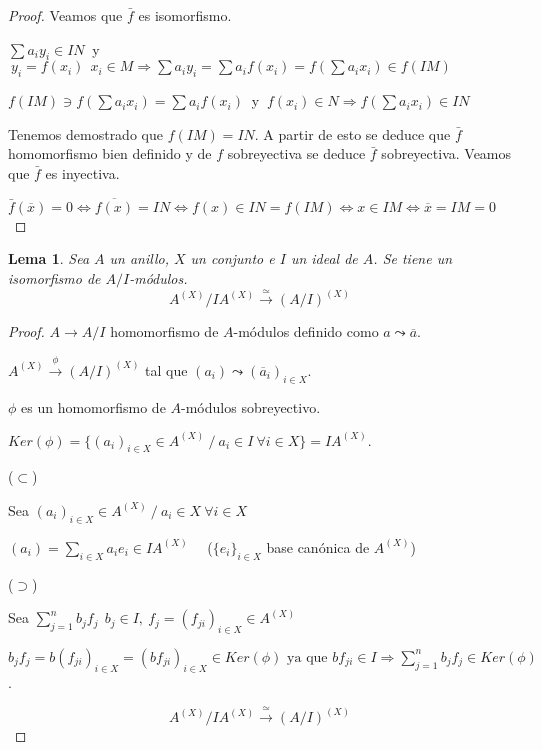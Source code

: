 \documentclass{article}
\theoremstyle{theorem-style}  %
\newtheorem{lemma}[theorem]{Lema}
\theoremstyle{definition}
\theoremstyle{example-style}
\begin{document}
	\begin{proof} 
		Veamos que $\bar{f}$ es isomorfismo.

		$\sum a_iy_i \in IN\ $ y $\  y_i=f(x_i)  \ \ x_i\in M \Rightarrow \sum a_iy_i=\sum a_if(x_i)=f(\sum a_ix_i)\in f(IM)$

		$f(IM) \ni f(\sum a_ix_i) = \sum a_if(x_i) \ $ y $\ f(x_i)\in N \Rightarrow f(\sum a_ix_i)\in IN$

		Tenemos demostrado que $f(IM)=IN$. A partir de esto se deduce que $\bar{f}$ homomorfismo bien definido y de $f$ sobreyectiva se deduce $\bar{f}$ sobreyectiva. Veamos que $\bar{f}$ es inyectiva.

		$\bar{f}(\overline{x})=0 \Leftrightarrow \overline{f(x)} = IN \Leftrightarrow f(x) \in IN=f(IM) \Leftrightarrow x \in IM \Leftrightarrow \overline{x}=IM=0$

	\end{proof}

	\begin{lemma}
		Sea $A$ un anillo, $X$ un conjunto e $I$ un ideal de $A$. Se tiene un isomorfismo de $A/I$-módulos.
		\[A^{(X)}/IA^{(X)} \xrightarrow{\ \simeq\ }(A/I)^{(X)}\]
	\end{lemma}

	\begin{proof}

		$A\rightarrow A/I$ homomorfismo de $A$-módulos definido como $a \leadsto \overline{a}$.

		$A^{(X)} \xrightarrow{\ \phi\ }(A/I)^{(X)}$ tal que $(a_i)\leadsto (\overline{a}_i)_{i \in X}.$

		$\phi$ es un homomorfismo de $A$-módulos sobreyectivo.

		$Ker(\phi)=\{(a_i)_{i\in X} \in A^{(X)} \ / \ a_i \in I \ \forall i \in X\} = IA^{(X)}.$

		($\subset$)

		Sea $(a_i)_{i\in X} \in A^{(X)} \ / \ a_i \in X \ \forall i \in X$

		$(a_i)=\sum_{i \in X}a_ie_i \in IA^{(X)}$ \ \ ($\{e_i\}_{i\in X}$ base canónica de $A^{(X)}$)

		($\supset$)

		Sea $\sum_{j=1}^nb_jf_j \ \ b_j \in I, \ f_j=(f_{ji})_{i\in X} \in A^{(X)}$

		$b_jf_j=b(f_{ji})_{i\in X} = (bf_{ji})_{i\in X} \in Ker(\phi) \text{ ya que }bf_{ji} \in I \Rightarrow \sum_{j=1}^nb_jf_j \in Ker(\phi)$.

		\[A^{(X)}/IA^{(X)} \xrightarrow{\ \simeq \ } (A/I)^{(X)} \]
	\end{proof}
\end{document}
